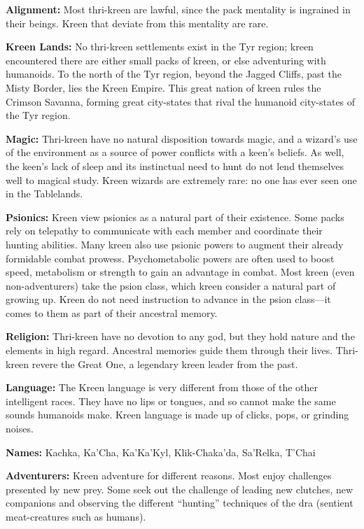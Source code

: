 \textbf{Alignment:} Most thri-kreen are lawful, since the pack mentality is ingrained in their beings. Kreen that deviate from this mentality are rare.

\textbf{Kreen Lands:} No thri-kreen settlements exist in the Tyr region; kreen encountered there are either small packs of kreen, or else adventuring with humanoids. To the north of the Tyr region, beyond the Jagged Cliffs, past the Misty Border, lies the Kreen Empire. This great nation of kreen rules the Crimson Savanna, forming great city-states that rival the humanoid city-states of the Tyr region.

\textbf{Magic:} Thri-kreen have no natural disposition towards magic, and a wizard's use of the environment as a source of power conflicts with a keen's beliefs. As well, the keen's lack of sleep and its instinctual need to hunt do not lend themselves well to magical study. Kreen wizards are extremely rare: no one has ever seen one in the Tablelands.

\textbf{Psionics:} Kreen view psionics as a natural part of their existence. Some packs rely on telepathy to communicate with each member and coordinate their hunting abilities. Many kreen also use psionic powers to augment their already formidable combat prowess. Psychometabolic powers are often used to boost speed, metabolism or strength to gain an advantage in combat. Most kreen (even non-adventurers) take the psion class, which kreen consider a natural part of growing up. Kreen do not need instruction to advance in the psion class---it comes to them as part of their ancestral memory.

\textbf{Religion:} Thri-kreen have no devotion to any god, but they hold nature and the elements in high regard. Ancestral memories guide them through their lives. Thri-kreen revere the Great One, a legendary kreen leader from the past.

\textbf{Language:} The Kreen language is very different from those of the other intelligent races. They have no lips or tongues, and so cannot make the same sounds humanoids make. Kreen language is made up of clicks, pops, or grinding noises.

\textbf{Names:} Kachka, Ka'Cha, Ka'Ka'Kyl, Klik-Chaka'da, Sa'Relka, T'Chai

\textbf{Adventurers:} Kreen adventure for different reasons. Most enjoy challenges presented by new prey. Some seek out the challenge of leading new clutches, new companions and observing the different ``hunting'' techniques of the dra (sentient meat-creatures such as humans).

